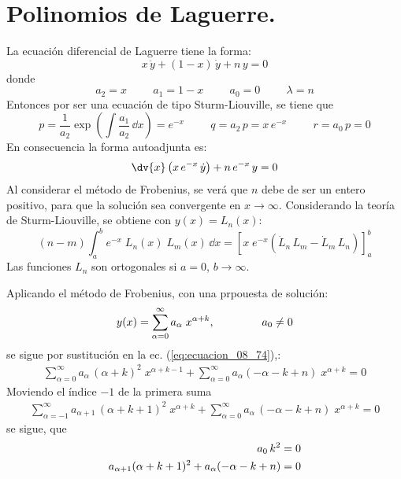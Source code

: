 \section{Polinomios de Laguerre.}
La ecuación diferencial de Laguerre tiene la forma:
\begin{equation}
x \, \ddot{y} + (1 - x) \, \dot{y} + n \, y = 0
\label{eq:ecuacion_08_74}
\end{equation}
donde
\[ a_{2} = x \hspace{1cm} a_{1} = 1 - x \hspace{1cm} a_{0} = 0 \hspace{1cm} \lambda = n \]
Entonces por ser una ecuación de tipo Sturm-Liouville, se tiene que
\[ p = \dfrac{1}{a_{2}} \exp \left( \int \frac{a_{1}}{a_{2}} \, \dd x \right) = e^{-x} \hspace{1cm} q = a_{2} \, p = x \, e^{-x} \hspace{1cm} r = a_{0} \, p = 0 \]
En consecuencia la forma autoadjunta es:
\[ \dv{x} \left( x \, e^{-x} \, \dot{y} \right) + n \, e^{-x} \,  y = 0  \]
Al considerar el método de Frobenius, se verá que $n$ debe de ser un entero positivo, para que la solución sea convergente en $x \to \infty$. Considerando la teoría de Sturm-Liouville, se obtiene con $y(x) = L_{n}(x)$:
\begin{equation}
(n - m) \int_{a}^{b} e^{-x} \; L_{n}(x) \; L_{m}(x) \, \dd x = \left[ x \; e^{-x} (\dot{L}_{n} \, L_{m} - \dot{L}_{m} \, L_{n}) \right]_{a}^{b}
\label{eq:ecuacion_08_75}
\end{equation}
Las funciones $L_{n}$ son ortogonales si $a=0$, $b \to \infty$.
\par
Aplicando el método de Frobenius, con una prpouesta de solución:
\[ y(x) = \sum_{\alpha = 0}^{\infty} a_{\alpha} \; x^{\alpha + k}, \hspace{1.5cm} a_{0} \neq 0 \]
se sigue por sustitución en la ec. (\ref{eq:ecuacion_08_74}),:
\begin{align*}
\sum_{\alpha = 0}^{\infty} a_{\alpha} \, (\alpha + k)^{2} \; x^{\alpha + k - 1} + \sum_{\alpha = 0}^{\infty} a_{\alpha} (- \alpha - k + n) \; x^{\alpha + k} = 0
\end{align*}
Moviendo el índice $-1$ de la primera suma
\begin{align*}
\sum_{\alpha = -1}^{\infty} a_{\alpha + 1} \, (\alpha + k + 1)^{2} \; x^{\alpha + k} + \sum_{\alpha = 0}^{\infty} a_{\alpha} \, (- \alpha - k + n) \; x^{\alpha + k} = 0
\end{align*}
se sigue,  que
\begin{align*}
a_{0} \, k^{2} &= 0 \nonumber \\
a_{\alpha + 1} (\alpha + k + 1)^{2} + a_{\alpha} (-\alpha - k + n) &= 0 
\end{align*}
